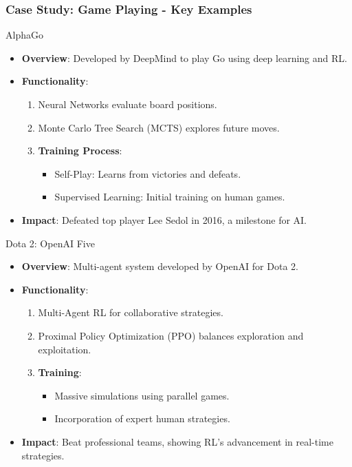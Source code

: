 \documentclass[aspectratio=169]{beamer}
\begin{document}
\begin{frame}[fragile]
    \frametitle{Case Study: Game Playing - Key Examples}
    \begin{block}{AlphaGo}
        \begin{itemize}
            \item \textbf{Overview}: Developed by DeepMind to play Go using deep learning and RL.
            \item \textbf{Functionality}:
                \begin{enumerate}
                    \item Neural Networks evaluate board positions.
                    \item Monte Carlo Tree Search (MCTS) explores future moves.
                    \item \textbf{Training Process}:
                        \begin{itemize}
                            \item Self-Play: Learns from victories and defeats.
                            \item Supervised Learning: Initial training on human games.
                        \end{itemize}
                \end{enumerate}
            \item \textbf{Impact}: Defeated top player Lee Sedol in 2016, a milestone for AI.
        \end{itemize}
    \end{block}
    
    \begin{block}{Dota 2: OpenAI Five}
        \begin{itemize}
            \item \textbf{Overview}: Multi-agent system developed by OpenAI for Dota 2.
            \item \textbf{Functionality}:
                \begin{enumerate}
                    \item Multi-Agent RL for collaborative strategies.
                    \item Proximal Policy Optimization (PPO) balances exploration and exploitation.
                    \item \textbf{Training}:
                        \begin{itemize}
                            \item Massive simulations using parallel games.
                            \item Incorporation of expert human strategies.
                        \end{itemize}
                \end{enumerate}
            \item \textbf{Impact}: Beat professional teams, showing RL's advancement in real-time strategies.
        \end{itemize}
    \end{block}
\end{frame}
\end{document}
